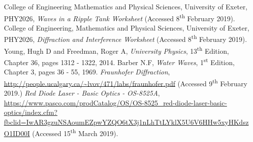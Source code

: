 \documentclass{article}
\begin{document}
\begin{thebibliography}{9}
 College of Engineering Mathematics and Physical Sciences, University of Exeter, PHY2026, \textit{Waves in a Ripple Tank Worksheet} (Accessed 8\textsuperscript{th} February 2019).
 College of Engineering, Mathematics and Physical Sciences, University of Exeter, PHY2026, \textit{Diffraction and Interference Worksheet} (Accessed 8\textsuperscript{th} February 2019).
 Young, Hugh D and Freedman, Roger A, \textit{University Physics}, 13\textsuperscript{th} Edition, Chapter 36, pages 1312 - 1322, 2014.
 Barber N.F, \textit{Water Waves}, 1\textsuperscript{st} Edition, Chapter 3, pages 36 - 55, 1969. 
 \textit{Fraunhofer Diffraction}, \url{http://people.ucalgary.ca/~lvov/471/labs/fraunhofer.pdf} (Accessed 9\textsuperscript{th} February 2019.)
 \textit{Red Diode Laser - Basic Optics - OS-8525A}, 
\url{https://www.pasco.com/prodCatalog/OS/OS-8525_red-diode-laser-basic-optics/index.cfm?fbclid=IwAR3gzuNSAoumEZpwYZQO6tX3j1nLhTtLYklX5U6V6HHw5xyHKdszO1ID00I} (Accessed 15\textsuperscript{th} March 2019).

\end{thebibliography}
\end{document}
